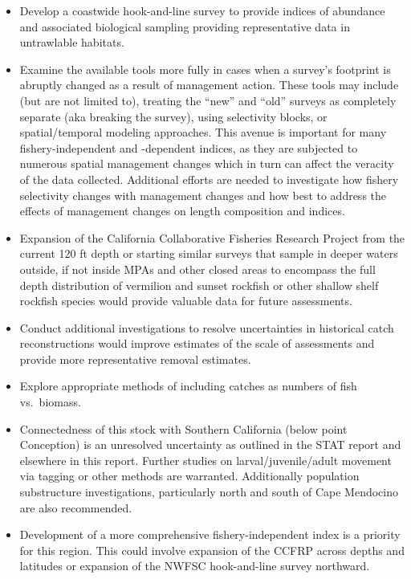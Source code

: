 \documentclass[11pt,
  english,
  a4paper,
]{article}
\begin{document}
\begin{itemize}
\item
  Develop a coastwide hook-and-line survey to provide indices of abundance and associated biological sampling providing representative data in untrawlable habitats.
\item
  Examine the available tools more fully in cases when a survey's footprint is abruptly changed as a result of management action. These tools may include (but are not limited to), treating the ``new'' and ``old'' surveys as completely separate (aka breaking the survey), using selectivity blocks, or spatial/temporal modeling approaches. This avenue is important for many fishery-independent and -dependent indices, as they are subjected to numerous spatial management changes which in turn can affect the veracity of the data collected. Additional efforts are needed to investigate how fishery selectivity changes with management changes and how best to address the effects of management changes on length composition and indices.
\item
  Expansion of the California Collaborative Fisheries Research Project from the current 120 ft depth or starting similar surveys that sample in deeper waters outside, if not inside MPAs and other closed areas to encompass the full depth distribution of vermilion and sunset rockfish or other shallow shelf rockfish species would provide valuable data for future assessments.
\item
  Conduct additional investigations to resolve uncertainties in historical catch reconstructions would improve estimates of the scale of assessments and provide more representative removal estimates.
\item
  Explore appropriate methods of including catches as numbers of fish vs.~biomass.
\item
  Connectedness of this stock with Southern California (below point Conception) is an unresolved uncertainty as outlined in the STAT report and elsewhere in this report. Further studies on larval/juvenile/adult movement via tagging or other methods are warranted. Additionally population substructure investigations, particularly north and south of Cape Mendocino are also recommended.
\item
  Development of a more comprehensive fishery-independent index is a priority for this region. This could involve expansion of the CCFRP across depths and latitudes or expansion of the NWFSC hook-and-line survey northward.
\end{itemize}

\tagstructend
\end{document}
